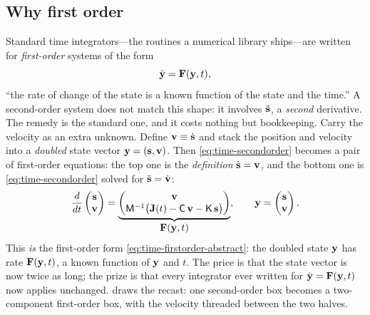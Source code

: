 \subsection{Why first order}

Standard time integrators---the routines a numerical library ships---are written
for \emph{first-order} systems of the form
\begin{equation}
  \dot{\mathbf{y}} = \mathbf{F}(\mathbf{y}, t),
  \label{eq:time-firstorder-abstract}
\end{equation}
``the rate of change of the state is a known function of the state and the time.''
A second-order system does not match this shape: it involves $\ddot{\mathbf{s}}$, a
\emph{second} derivative. The remedy is the standard one, and it costs nothing but
bookkeeping. Carry the velocity as an extra unknown. Define
$\mathbf{v} \equiv \dot{\mathbf{s}}$ and stack the position and velocity into a \emph{doubled}
state vector $\mathbf{y} = (\mathbf{s}, \mathbf{v})$. Then \cref{eq:time-secondorder} becomes a pair of
first-order equations: the top one is the \emph{definition} $\dot{\mathbf{s}} = \mathbf{v}$, and
the bottom one is \cref{eq:time-secondorder} solved for $\ddot{\mathbf{s}} = \dot{\mathbf{v}}$:
\begin{equation}
  \frac{d}{dt}\begin{pmatrix}\mathbf{s}\\\mathbf{v}\end{pmatrix}
  =
  \underbrace{\begin{pmatrix}
    \mathbf{v}\\
    \mathsf{M}^{-1}\bigl(\mathbf{J}(t) - \mathsf{C}\,\mathbf{v} - \mathsf{K}\,\mathbf{s}\bigr)
  \end{pmatrix}}_{\displaystyle \mathbf{F}(\mathbf{y}, t)},
  \qquad
  \mathbf{y} = \begin{pmatrix}\mathbf{s}\\\mathbf{v}\end{pmatrix}.
  \label{eq:time-recast}
\end{equation}
This \emph{is} the first-order form \cref{eq:time-firstorder-abstract}: the doubled
state $\mathbf{y}$ has rate $\mathbf{F}(\mathbf{y}, t)$, a known function of $\mathbf{y}$ and $t$. The price is
that the state vector is now twice as long; the prize is that every integrator
ever written for $\dot{\mathbf{y}} = \mathbf{F}(\mathbf{y}, t)$ now applies unchanged.
 draws the recast: one second-order box becomes a two-component
first-order box, with the velocity threaded between the two halves.


